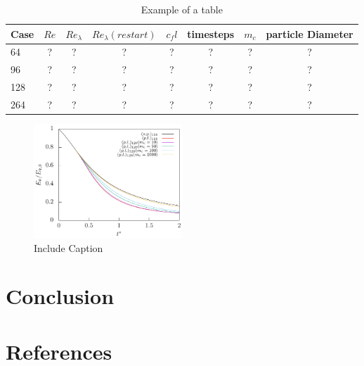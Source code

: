 \documentclass[a4paper,10pt]{article}
\numberwithin{equation}{section} %
\begin{document}
\pagebreak
\begin{table}[h]
\begin{tabular}{l | c c c c c c c }
Case & $Re$ & $Re_\lambda$ & $Re_\lambda (restart)$ & $c_fl$ & timesteps  & $m_c$ & particle Diameter \\
\hline
\hline
64 & ? & ? & ? & ? & ? & ? & ? \\
96 & ? & ? & ? & ? & ? & ? & ? \\
128 & ? & ? & ? & ? & ? & ? & ?  \\
264 & ? & ? & ? & ? & ? & ? & ?  \\
\hline
\end{tabular}
\caption{Example of a table}
\label{table1}
\end{table}
\begin{figure}[]
	\centering
  \includegraphics[width=0.5\textwidth]{./../Simulationsergebnisse/variationWolken/128/kineticEnergy_time.pdf}
	\caption{Include Caption}
	\label{kineticEnergy_time_128}
\end{figure}
\pagebreak
\section{Conclusion}
\pagebreak
\section{References}
\nocite{*} %
\pagebreak
\end{document}
